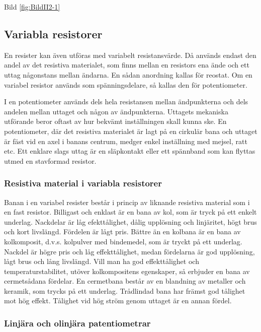 Bild \ref{fig:BildII2-1}

\subsection{Variabla resistorer}

En resister kan även utföras med variabelt resistansvärde. Då används endast
den andel av det resistiva materialet, som finns mellan en resistors ena ände
och ett uttag någonstans mellan ändarna. En sådan anordning kallas för reostat.
Om en variabel resistor används som spänningsdelare, så kallas den för
potentiometer.

I en potentiometer används dels hela resistansen mellan ändpunkterna och dels
andelen mellan uttaget och någon av ändpunkterna. Uttagets mekaniska utförande
beror oftast av hur bekvämt inställningen skall kunna ske. En potentiometer,
där det resistiva materialet är lagt på en cirkulär bana och uttaget är fäst
vid en axel i banans centrum, medger enkel inställning med mejsel, ratt etc.
Ett enklare slags uttag är en släpkontakt eller ett spännband som kan flyttas
utmed en stavformad resistor.

\subsubsection{Resistiva material i variabla resistorer}

Banan i en variabel resister består i princip av liknande resistiva material
som i en fast resistor. Billigast och enklast är en bana av kol, som är tryck
på ett enkelt underlag. Nackdelar är låg efekttålighet, dålig upplösning och
linjäritet, högt brus och kort livslängd. Fördelen är lågt pris.
Bättre än en kolbana är en bana av kolkomposit, d.v.s. kolpulver med bindemedel,
som är tryckt på ett underlag. Nackdel är högre pris och låg effekttålighet,
medan fördelarna är god upplösning, lågt brus och lång livslängd.
Vill man ha god effekttålighet och temperaturstabilitet, utöver kolkompositens
egenskaper, så erbjuder en bana av cermetsådana fördelar. En cermetbana består
av en blandning av metaller och keramik, som trycks på ett underlag.
Trådlindad bana har främst god tålighet mot hög effekt. Tålighet vid hög ström
genom uttaget är en annan fördel.

\subsubsection{Linjära och olinjära patentiometrar}

